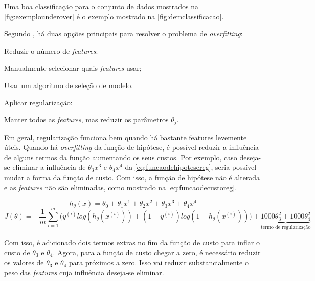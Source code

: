 Uma boa classificação para o conjunto de dados mostrados na \autoref{fig:exemplounderover} é o exemplo mostrado na \autoref{fig:demclassificacao}.

Segundo \cite{machinelearningcoursera}, há duas opções principais para resolver o problema de \textit{overfitting}:

\begin{alineas}
	\item Reduzir o número de \textit{features}:
		\begin{alineas}
			\item Manualmente selecionar quais \textit{features} usar;
			\item Usar um algoritmo de seleção de modelo.
		\end{alineas}
	\item Aplicar regularização:
		\begin{alineas}
			\item Manter todos as \textit{features}, mas reduzir os parâmetros $\theta_j$.
		\end{alineas}
\end{alineas}

Em geral, regularização funciona bem quando há bastante features levemente úteis. Quando há \textit{overfitting} da função de hipótese, é possível reduzir a influência de alguns termos da função aumentando os seus custos. Por exemplo, caso deseja-se eliminar a influência de $\theta_3x^3$ e $\theta_4x^4$ da \autoref{eq:funcaodehipotesereg}, seria possível mudar a forma da função de custo. Com isso, a função de hipótese não é alterada e as \textit{features} não são eliminadas, como mostrado na \autoref{eq:funcaodecustoreg}.

\begin{equation} \label{eq:funcaodehipotesereg}
h_{\theta}(x) = \theta_0 + \theta_1 x^1 + \theta_2 x^2 + \theta_3 x^3 + \theta_4 x^4
\end{equation}
\begin{equation} \label{eq:funcaodecustoreg}
J(\theta) = - \frac{1}{m}\sum\limits_{i=1}^{m}\Big( y^{(i)}log(h_{\theta}(x^{(i)})) + (1-y^{(i)})log(1 - h_{\theta}(x^{(i)})) \Big)
+ \underbrace{1000 \theta_3^2 + 1000 \theta_4^2}_\text{termo de regularização}
\end{equation}

Com isso, é adicionado dois termos extras no fim da função de custo para inflar o custo de $\theta_3$ e $\theta_4$. Agora, para a função de custo chegar a zero, é necessário reduzir os valores de $\theta_3$ e $\theta_4$ para próximos a zero. Isso vai reduzir substancialmente o peso das \textit{features} cuja influência deseja-se eliminar.

